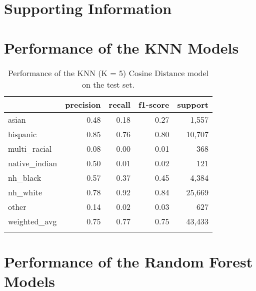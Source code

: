 \documentclass[12pt, letterpaper]{article}
\begin{document}
\appendix
\renewcommand{\thesection}{SI \arabic{section}}
\renewcommand\thetable{\thesection.\arabic{table}}  
\renewcommand\thefigure{\thesection.\arabic{figure}}
\section*{Supporting Information}\label{si}

\section{Performance of the KNN Models}\label{knn_perf}

\begin{table}[h!]
\centering
\caption{Performance of the KNN (K = 5) Cosine Distance model on the test set.}
\begin{tabular}{lrrrr}
\hline
               &   precision &   recall &   f1-score &   support \\
\hline
   asian      & 0.48    &  0.18 &     0.27  &    1,557\\
     hispanic   &    0.85   &   0.76   &   0.80   &  10,707\\
 multi\_racial   &    0.08   &   0.00   &   0.01  &     368\\
native\_indian   &    0.50  &    0.01   &   0.02  &     121\\
     nh\_black   &    0.57  &    0.37   &   0.45  &    4,384\\
     nh\_white   &    0.78   &   0.92   &   0.84  &   25,669\\
        other   &    0.14   &   0.02   &   0.03   &    627\\
 weighted\_avg   &    0.75   &   0.77   &   0.75  &   43,433\\
\hline
\label{table:knn_last_name}
\end{tabular}
\end{table}

\clearpage
\section{Performance of the Random Forest Models}\label{rf_perf}
\end{document}

